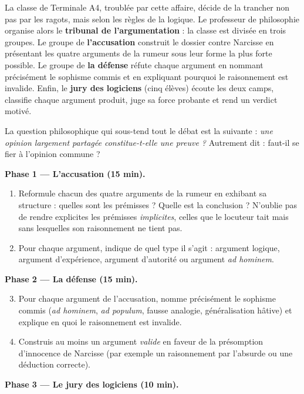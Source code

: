 \documentclass[11pt]{article}
\newcommand{\cle}[1]{{\popxbold\color{popdark}#1}}
\newcounter{popsec}
\newcounter{popsub}
\newcommand{\courssub}[1]{%
  \stepcounter{popsub}%
  \par\vspace{9pt}\noindent{\popxbold\fontsize{11.5}{13}\selectfont\color{popink}{\color{poporange}\thepopsec.\thepopsub}\hspace{6pt}#1}\par\nopagebreak\vspace{4pt}
}
\begin{document}
La classe de Terminale A4, troublée par cette affaire, décide de la trancher non pas par les ragots, mais selon les règles de la logique. Le professeur de philosophie organise alors le \textbf{tribunal de l'argumentation} : la classe est divisée en trois groupes. Le groupe de \textbf{l'accusation} construit le dossier contre Narcisse en présentant les quatre arguments de la rumeur sous leur forme la plus forte possible. Le groupe de \textbf{la défense} réfute chaque argument en nommant précisément le sophisme commis et en expliquant pourquoi le raisonnement est invalide. Enfin, le \textbf{jury des logiciens} (cinq élèves) écoute les deux camps, classifie chaque argument produit, juge sa force probante et rend un verdict motivé.

La question philosophique qui sous-tend tout le débat est la suivante : \emph{une opinion largement partagée constitue-t-elle une preuve ?} Autrement dit : faut-il se fier à l'opinion commune ?

\courssub{Consignes}

\textbf{Phase 1 — L'accusation (15 min).}

\begin{enumerate}
\item Reformule chacun des quatre arguments de la rumeur en exhibant sa structure : quelles sont les \cle{prémisses} ? Quelle est la \cle{conclusion} ? N'oublie pas de rendre explicites les prémisses \emph{implicites}, celles que le locuteur tait mais sans lesquelles son raisonnement ne tient pas.
\item Pour chaque argument, indique de quel \cle{type} il s'agit : argument logique, argument d'expérience, argument d'autorité ou argument \emph{ad hominem}.
\end{enumerate}

\textbf{Phase 2 — La défense (15 min).}

\begin{enumerate}
\setcounter{enumi}{2}
\item Pour chaque argument de l'accusation, nomme précisément le \cle{sophisme} commis (\emph{ad hominem}, \emph{ad populum}, fausse analogie, généralisation hâtive) et explique en quoi le raisonnement est invalide.
\item Construis au moins un argument \emph{valide} en faveur de la présomption d'innocence de Narcisse (par exemple un raisonnement par l'absurde ou une déduction correcte).
\end{enumerate}

\textbf{Phase 3 — Le jury des logiciens (10 min).}
\end{document}
